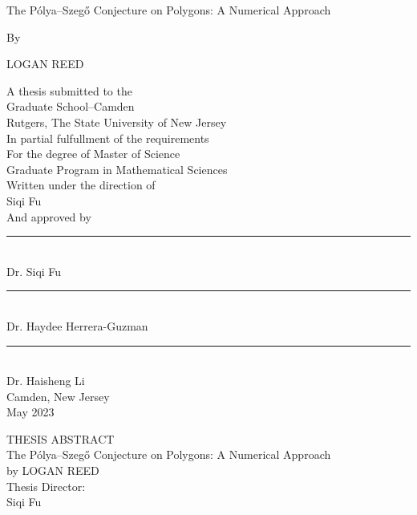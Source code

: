 \documentclass[12pt]{report}
\numberwithin{definition}{section}
\begin{document}
  \doublespacing
  
\begin{titlepage}

   \begin{center}
      

      The Pólya–Szegő Conjecture on Polygons: A Numerical Approach

            
     
       By
              


      LOGAN REED

     
            
        A thesis submitted to the \\
       Graduate School–Camden\\
       Rutgers, The State University of New Jersey\\
       In partial fulfullment of the requirements\\
       For the degree of Master of Science\\
       Graduate Program in Mathematical Sciences \\
       Written under the direction of \\
       Siqi Fu\\
       And approved by \\
       \noindent\rule{4cm}{0.4pt}\\
       Dr. Siqi Fu\\
      \noindent\rule{4cm}{0.4pt}\\
       Dr. Haydee Herrera-Guzman\\
           \noindent\rule{4cm}{0.4pt}\\
       Dr. Haisheng Li\\

         \vspace{0.8cm}
       Camden, New Jersey\\
       May 2023
            
       \vspace{0.8cm}
     
  
        
            
   \end{center}
   
\end{titlepage}





  \begin{center}

\break
  THESIS ABSTRACT\\
 
      The Pólya–Szegő Conjecture on Polygons: A Numerical Approach \\
         by LOGAN REED\\
     
     Thesis Director: \\
     Siqi Fu
  \end {center}
\end{document}
